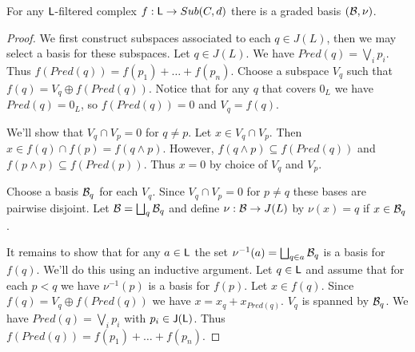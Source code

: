 \begin{prop}\label{prop:bases}
For any ${\mathsf L}$-filtered complex $f:{\mathsf L}\to Sub(C,d)$ there is a graded basis $({\mathcal B},\nu)$.
\end{prop}
\begin{proof}
We first construct subspaces associated to each $q\in J(L)$, then we may select a basis for these subspaces.  Let $q\in J(L)$.  We have $Pred(q)=\bigvee_i p_i$.  Thus $f(Pred(q)) = f(p_1)+\ldots + f(p_n)$.    Choose a subspace $V_q$ such that $f(q) = V_q \oplus f(Pred(q))$. Notice that for any $q$ that covers $0_L$ we have $Pred(q)=0_L$, so $f(Pred(q)) = 0$ and $V_q = f(q)$.

We'll show that $V_q\cap V_p=0$ for $q\neq p$.  Let $x\in V_q\cap V_p$.  Then $x\in f(q)\cap f(p) = f(q\wedge p)$.  However, $f(q\wedge p)\subseteq f(Pred(q))$ and $f(p\wedge p)\subseteq f(Pred(p))$.  Thus $x=0$ by choice of $V_q$ and $V_p$.  

Choose a basis ${\mathcal B}_q$ for each $V_q$.  Since $V_q\cap V_p=0$ for $p\neq q$ these bases are pairwise disjoint. Let ${\mathcal B}=\bigsqcup_q {\mathcal B}_q$ and define $\nu:{\mathcal B}\to J(L)$ by $\nu(x) = q$ if $x\in {\mathcal B}_q$.


  It remains to show that for any $a\in {\mathsf L}$ the set $\nu^{-1}(a) = \bigsqcup_{q\in a} {\mathcal B}_q $ is a basis for $f(q)$.  We'll do this using an inductive argument.  Let $q\in {\mathsf L}$ and assume that for each $p<q$ we have $\nu^{-1}(p)$ is a basis for $f(p)$.  Let $x\in f(q)$.  Since $f(q) = V_q\oplus f(Pred(q))$ we have $x = x_q+x_{Pred(q)}$.  $V_q$ is spanned by ${\mathcal B}_q$.  We have $Pred(q) = \bigvee_i p_i$ with $p_i\in {\mathsf J}({\mathsf L})$.  Thus $f(Pred(q)) = f(p_1) + \ldots + f(p_n)$.  
  
  
%  
%  
%
\end{proof}


